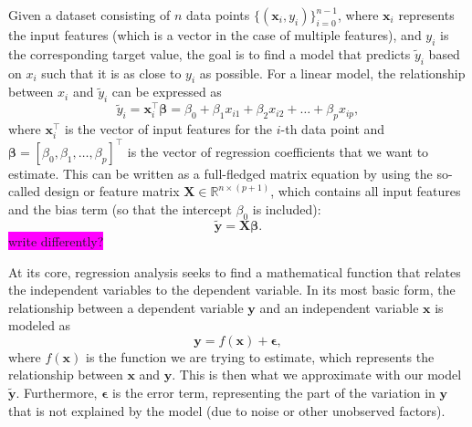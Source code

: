 \documentclass[aps,pra,english,notitlepage,reprint,nofootinbib]{revtex4-1}  %
\begin{document}
Given a dataset consisting of $n$ data points $\{(\mathbf{x}_i, y_i)\}_{i=0}^{n-1}$, where $\mathbf{x}_i$ represents the input features (which is a vector in the case of multiple features), and $y_i$ is the corresponding target value, the goal is to find a model that predicts $\tilde{y}_i$ based on $x_i$ such that it is as close to $y_i$ as possible. For a linear model, the relationship between $x_i$ and $\tilde{y}_i$ can be expressed as
\begin{equation}
\tilde{y}_i = \mathbf{x}_i^\top \boldsymbol{\beta} = \beta_0 + \beta_1 x_{i1} + \beta_2 x_{i2} + \dots + \beta_p x_{ip},
\end{equation}
where $\mathbf{x}_i^\top$ is the vector of input features for the $i$-th data point and $\boldsymbol{\beta} = [\beta_0, \beta_1, \dots, \beta_p]^\top$ is the vector of regression coefficients that we want to estimate. This can be written as a full-fledged matrix equation by using the so-called design or feature matrix $\mathbf{X} \in \mathbb{R}^{n \times (p+1)}$, which contains all input features and the bias term (so that the intercept $\beta_0$ is included):
\begin{equation}
  \mathbf{\tilde{y}}=\mathbf{X}\boldsymbol{\beta}.
\end{equation}
\colorbox{magenta}{write differently?}

At its core, regression analysis seeks to find a mathematical function that relates the independent variables to the dependent variable. In its most basic form, the relationship between a dependent variable $\mathbf{y}$ and an independent variable $\mathbf{x}$ is modeled as
\begin{equation}
  \mathbf{y} = f(\mathbf{x}) + \boldsymbol{\epsilon},
\end{equation}
where $f(\mathbf{x})$ is the function we are trying to estimate, which represents the relationship between $\mathbf{x}$ and $\mathbf{y}$. This is then what we approximate with our model $\mathbf{\tilde{y}}$. Furthermore, $\boldsymbol{\epsilon}$ is the error term, representing the part of the variation in $\mathbf{y}$ that is not explained by the model (due to noise or other unobserved factors). 
\end{document}

